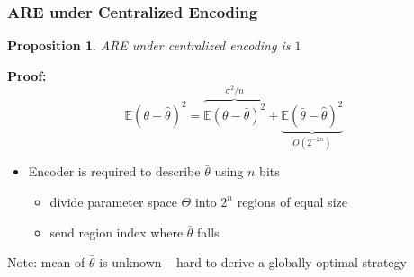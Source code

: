 \documentclass[mathserif]{beamer}
\newtheorem{prop}{Proposition}
\begin{document}
\begin{frame}
\frametitle{ARE under Centralized Encoding}

\begin{prop} ARE under centralized encoding is $1$
\end{prop}
\pause

\textbf{Proof:}
\[
\mathbb E \left( \theta- \widehat{\theta} \right)^2 = \overbrace{\mathbb E \left( \theta- \bar{\theta} \right)^2}^{\sigma^2/n} + \underbrace{\mathbb E \left( \bar{\theta}- \widehat{\theta} \right)^2}_{O(2^{-2n})}
\]
\pause
\begin{itemize}
\item Encoder is required to describe $\bar{\theta}$ using $n$ bits
\begin{itemize}
\item divide parameter space $\Theta$ into $2^n$ regions of equal size
\item send region index where $\bar{\theta}$ falls
\end{itemize}
\end{itemize}
\bigskip
\pause
Note: mean of $\bar{\theta}$ is unknown -- hard to derive a globally optimal strategy
\end{frame}
\end{document}

